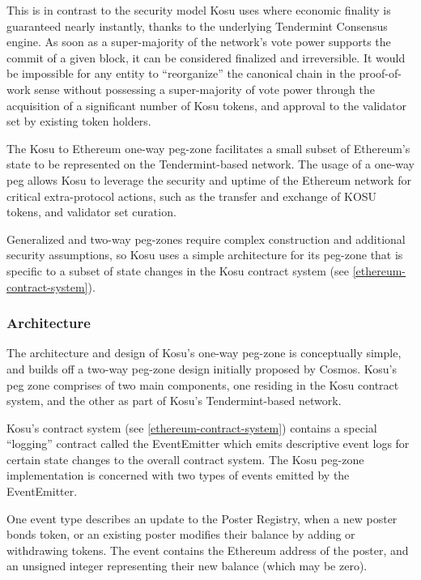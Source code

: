 \documentclass[10pt]{article}
\begin{document}
This is in contrast to the security model Kosu uses where economic finality is guaranteed nearly instantly, thanks to the underlying Tendermint Consensus engine\cite{tendermint, tendermint-wp}. As soon as a super-majority of the network’s vote power supports the commit of a given block, it can be considered finalized and irreversible. It would be impossible for any entity to ``reorganize'' the canonical chain in the proof-of- work sense without possessing a super-majority of vote power through the acquisition of a significant number of 
Kosu tokens, and approval to the validator set by existing token holders.
\medskip

The Kosu to Ethereum one-way peg-zone facilitates a small subset of Ethereum’s state to be represented on the Tendermint-based network. The usage of a one-way peg allows Kosu to leverage the security and uptime of the Ethereum network for critical extra-protocol actions, such as the transfer and exchange of KOSU tokens, and validator set curation.
\medskip

Generalized and two-way peg-zones require complex construction\cite{peggy-spec} and additional security assumptions, so Kosu uses a simple architecture for its peg-zone that is specific to a subset of state changes in the Kosu contract system (see \ref{ethereum-contract-system}).
\subsubsection{Architecture}\label{peg-architecture}
The architecture and design of Kosu’s one-way peg-zone is conceptually simple, and builds off a two-way peg-zone design initially proposed by Cosmos\cite{peggy-spec}. Kosu’s peg zone comprises of two main components, one residing in the Kosu contract system, and the other as part of Kosu’s Tendermint-based network.
\medskip

Kosu’s contract system (see \ref{ethereum-contract-system}) contains a special ``logging'' contract called the EventEmitter which emits descriptive event logs for certain state changes to the overall contract system. The Kosu peg-zone implementation is concerned with two types of events emitted by the EventEmitter.
\medskip

One event type describes an update to the Poster Registry, when a new poster bonds token, or an existing poster modifies their balance by adding or withdrawing tokens. The event contains the Ethereum address of the poster, and an unsigned integer representing their new balance (which may be zero).
\medskip 
\end{document}
